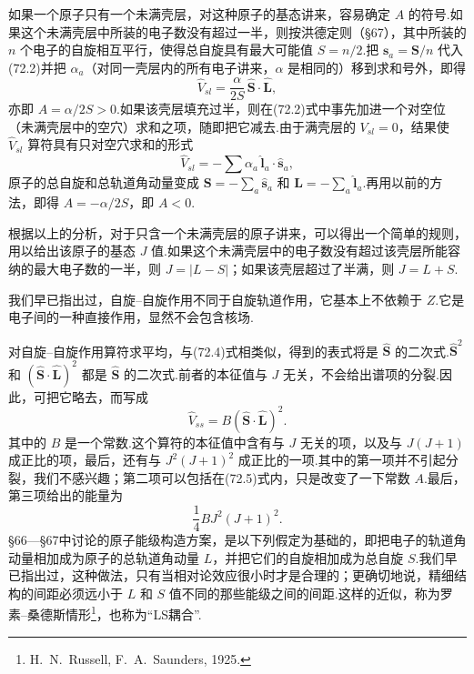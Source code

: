 如果一个原子只有一个未满壳层，对这种原子的基态讲来，容易确定 $A$ 的符号.如果这个未满壳层中所装的电子数没有超过一半，则按洪德定则（§67），其中所装的 $n$ 个电子的自旋相互平行，使得总自旋具有最大可能值 $S=n/2$.把 $\boldsymbol{s}_a=\boldsymbol{S}/n$ 代入(72.2)并把 $\alpha_a$（对同一壳层内的所有电子讲来，$\alpha$ 是相同的）移到求和号外，即得
\begin{equation*}
  \hat{V}_{sl}=\frac{\alpha}{2S}\,\hat{\boldsymbol{S}}\cdot\hat{\boldsymbol{L}},
\end{equation*}
亦即 $A=\alpha/2S>0$.如果该壳层填充过半，则在(72.2)式中事先加进一个对空位（未满壳层中的空穴）求和之项，随即把它减去.由于满壳层的 $V_{sl}=0$，结果使 $\hat{V}_{sl}$ 算符具有只对空穴求和的形式
\begin{equation*}
  \hat{V}_{sl}=-\sum\alpha_a\,\hat{\boldsymbol{l}}_a\cdot\hat{\boldsymbol{s}}_a,
\end{equation*}
原子的总自旋和总轨道角动量变成 $\boldsymbol{S}=-\sum_a\hat{\boldsymbol{s}}_a$ 和 $\boldsymbol{L}=-\sum_a\hat{\boldsymbol{l}}_a$.再用以前的方法，即得 $A=-\alpha/2S$，即 $A<0$.

根据以上的分析，对于只含一个未满壳层的原子讲来，可以得出一个简单的规则，用以给出该原子的基态 $J$ 值.如果这个未满壳层中的电子数没有超过该壳层所能容纳的最大电子数的一半，则 $J=|L-S|$；如果该壳层超过了半满，则 $J=L+S$.

我们早已指出过，自旋–自旋作用不同于自旋轨道作用，它基本上不依赖于 $Z$.它是电子间的一种直接作用，显然不会包含核场.

对自旋–自旋作用算符求平均，与(72.4)式相类似，得到的表式将是 $\hat{\boldsymbol{S}}$ 的二次式.$\hat{\boldsymbol{S}}^{2}$ 和 $(\hat{\boldsymbol{S}}\cdot\hat{\boldsymbol{L}})^{2}$ 都是 $\hat{\boldsymbol{S}}$ 的二次式.前者的本征值与 $J$ 无关，不会给出谱项的分裂.因此，可把它略去，而写成
\begin{equation}
  \hat{V}_{ss}=B(\hat{\boldsymbol{S}}\cdot\hat{\boldsymbol{L}})^{2}.
\end{equation}
其中的 $B$ 是一个常数.这个算符的本征值中含有与 $J$ 无关的项，以及与 $J(J+1)$ 成正比的项，最后，还有与 $J^{2}(J+1)^{2}$ 成正比的一项.其中的第一项并不引起分裂，我们不感兴趣；第二项可以包括在(72.5)式内，只是改变了一下常数 $A$.最后，第三项给出的能量为
\begin{equation}
  \frac{1}{4}BJ^{2}(J+1)^{2}.
\end{equation}
§66—§67中讨论的原子能级构造方案，是以下列假定为基础的，即把电子的轨道角动量相加成为原子的总轨道角动量 $L$，并把它们的自旋相加成为总自旋 $S$.我们早已指出过，这种做法，只有当相对论效应很小时才是合理的；更确切地说，精细结构的间距必须远小于 $L$ 和 $S$ 值不同的那些能级之间的间距.这样的近似，称为罗素–桑德斯情形\footnote{H.~N.~Russell, F.~A.~Saunders, 1925.}，也称为“LS耦合”.

